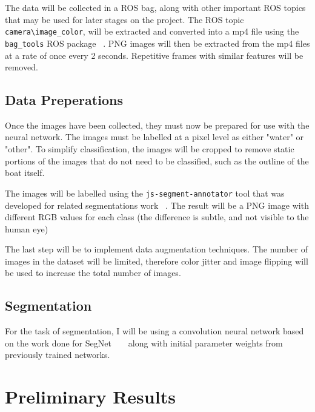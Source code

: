 \documentclass[10pt,twocolumn,letterpaper]{article}
\begin{document}
The data will be collected in a ROS bag, along with other important ROS topics that may be used
for later stages on the project. The ROS topic \verb|camera\image_color|, will be extracted and 
converted into a mp4 file using the \verb|bag_tools| ROS package ~\cite{bagtools}. PNG images
will then be extracted from the mp4 files at a rate of once every 2 seconds. Repetitive frames
with similar features will be removed.


\subsection{Data Preperations}
Once the images have been collected, they must now be prepared for use with the neural network.
The images must be labelled at a pixel level as either "water" or "other". To simplify classification,
the images will be cropped to remove static portions of the images that do not need to be classified,
such as the outline of the boat itself.

The images will be labelled using the \verb|js-segment-annotator| tool that was developed for related
segmentations work ~\cite{tangseng2017looking}. The result will be a PNG image with different 
RGB values for each class (the difference is subtle, and not visible to the human eye)

The last step will be to implement data augmentation techniques. The number of images in the 
dataset will be limited, therefore color jitter and image flipping will be used to increase the total 
number of images.

\subsection{Segmentation}
For the task of segmentation, I will be using a convolution neural network based on the work
done for SegNet ~\cite{DBLP:journals/corr/KendallBC15} ~\cite{DBLP:journals/corr/BadrinarayananK15}
along with initial parameter weights from previously trained networks.


\section{Preliminary Results}
\end{document}
